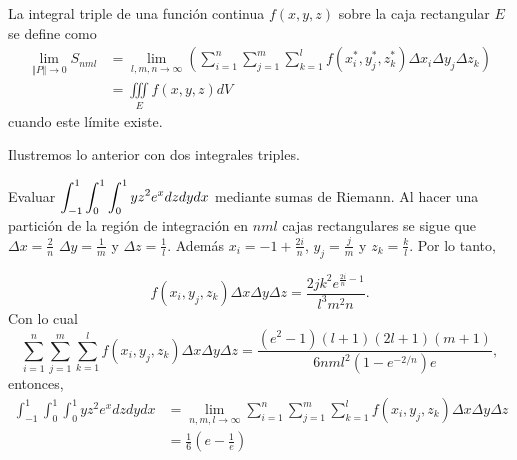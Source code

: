 \begin{defi}
La integral triple de una función continua $f(x,y,z)$
sobre la caja rectangular $E$ se define como
\begin{align}
\lim_{\left\Vert P\right\Vert \rightarrow 0}S_{nml} &= \lim_{l,m,n \to\infty}\left(\sum_{i=1}^{n}\sum_{j=1}^{m}\sum_{k=1}^{l}f\left( x_{i}^{\ast },y_{j}^{\ast },z_{k}^{\ast}\right) \Delta x_{i}\Delta y_{j}\Delta z_{k} \right)\nonumber \\
&=\iiint\limits_{E}f\left(x,y,z\right) dV
\end{align}
cuando este límite existe.
\end{defi}
Ilustremos lo anterior con dos integrales triples.
\begin{ejemplo}
Evaluar {\small $\displaystyle \int_{-1}^1\int_0^1\int_0^1  yz^2 e^{x} dzdydx$} mediante sumas de Riemann.
Al hacer una partición de la región de integración en $nml$ cajas rectangulares se sigue que
$\Delta x= \frac{2}{n}$ $\Delta y= \frac{1}{m}$ y $\Delta z= \frac{1}{l}$. Además
$x_i= -1+\frac{2i}{n}$, $y_j=\frac{j}{m}$ y $z_k=\frac{k}{l}$.
Por lo tanto,

\begingroup
\setlength{\abovedisplayskip}{0pt}
\[f(x_i,y_j,z_k)\Delta x \Delta y\Delta z=\frac{2 j k^2 e^{\frac{2 i}{n}-1}}{l^3 m^2 n}.\]
\endgroup
Con lo cual
\[\sum_{i=1}^n\sum_{j=1}^m\sum_{k=1}^l f(x_i,y_j,z_k)\Delta x \Delta y\Delta z=\frac{\left(e^2-1\right) (l+1)(2l+1)(m+1)}{6nml^2 \left(1-e^{-2/n}\right)e},\] entonces,
\begin{align*} \int_{-1}^1\int_0^1\int_0^1  yz^2 e^{x} dzdydx &= \lim_{n,m,l \to \infty}\sum_{i=1}^n\sum_{j=1}^m\sum_{k=1}^l f(x_i,y_j,z_k)\Delta x \Delta y\Delta z \\
  &=\frac{1}{6} \left(e-\frac{1}{e}\right)
\end{align*}
\end{ejemplo}

